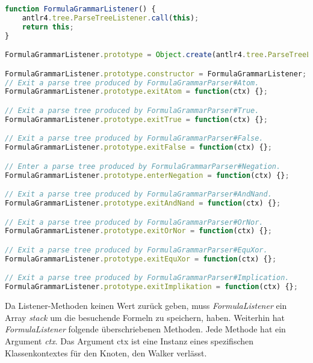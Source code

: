 \begin{lstlisting}[language=JavaScript, caption= FormulaGrammarListener, basicstyle=\scriptsize]
function FormulaGrammarListener() {
	antlr4.tree.ParseTreeListener.call(this);
	return this;
}

FormulaGrammarListener.prototype = Object.create(antlr4.tree.ParseTreeListener.prototype);

FormulaGrammarListener.prototype.constructor = FormulaGrammarListener;
// Exit a parse tree produced by FormulaGrammarParser#Atom.
FormulaGrammarListener.prototype.exitAtom = function(ctx) {};

// Exit a parse tree produced by FormulaGrammarParser#True.
FormulaGrammarListener.prototype.exitTrue = function(ctx) {};

// Exit a parse tree produced by FormulaGrammarParser#False.
FormulaGrammarListener.prototype.exitFalse = function(ctx) {};

// Enter a parse tree produced by FormulaGrammarParser#Negation.
FormulaGrammarListener.prototype.enterNegation = function(ctx) {};

// Exit a parse tree produced by FormulaGrammarParser#AndNand.
FormulaGrammarListener.prototype.exitAndNand = function(ctx) {};

// Exit a parse tree produced by FormulaGrammarParser#OrNor.
FormulaGrammarListener.prototype.exitOrNor = function(ctx) {};

// Exit a parse tree produced by FormulaGrammarParser#EquXor.
FormulaGrammarListener.prototype.exitEquXor = function(ctx) {};

// Exit a parse tree produced by FormulaGrammarParser#Implication.
FormulaGrammarListener.prototype.exitImplikation = function(ctx) {};

\end{lstlisting}

Da Listener-Methoden keinen Wert zurück geben, muss \textit{FormulaListener} ein Array \textit{stack} um die besuchende Formeln zu speichern, haben. Weiterhin hat \textit{FormulaListener} folgende überschriebenen Methoden. Jede Methode hat ein Argument \textit{ctx}. Das Argument ctx ist eine Instanz eines spezifischen Klassenkontextes für den Knoten, den Walker verlässt.


